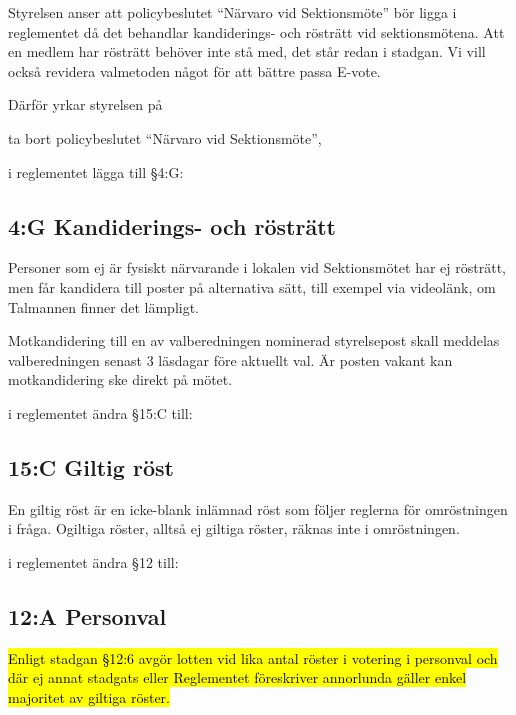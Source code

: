 \documentclass[../_main/handlingar.tex]{subfiles}
\begin{document}

Styrelsen anser att policybeslutet ``Närvaro vid Sektionsmöte'' bör ligga i reglementet då det behandlar kandiderings- och rösträtt vid sektionsmötena. Att en medlem har rösträtt behöver inte stå med, det står redan i stadgan. Vi vill också revidera valmetoden något för att bättre passa E-vote.

Därför yrkar styrelsen på

\begin{attsatser}
    \att ta bort policybeslutet ``Närvaro vid Sektionsmöte'',

    \att i reglementet lägga till \S4:G:\par
        \subsection*{4:G Kandiderings- och rösträtt}
        Personer som ej är fysiskt närvarande i lokalen vid Sektionsmötet har ej rösträtt, men får kandidera till poster på alternativa sätt, till exempel via videolänk, om Talmannen finner det lämpligt.

        Motkandidering till en av valberedningen nominerad styrelsepost skall meddelas valberedningen senast 3 läsdagar före aktuellt val. Är posten vakant kan motkandidering ske direkt på mötet.

    \att i reglementet ändra \S15:C till:\par
        \subsection*{15:C Giltig röst}
        En giltig röst är en icke-blank inlämnad röst som följer reglerna för omröstningen i fråga. Ogiltiga röster, alltså ej giltiga röster, räknas inte i omröstningen.

    \newpage

    \att i reglementet ändra \S12 till:\par
        \subsection*{12:A Personval}

        \hl{Enligt stadgan \S12:6 avgör lotten vid lika antal röster i votering i personval och där ej annat stadgats eller Reglementet föreskriver annorlunda gäller enkel majoritet av giltiga röster.}


\end{attsatser}
\end{document}
